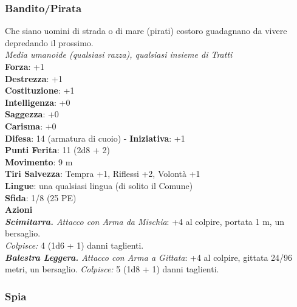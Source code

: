 \begin{multicols}{2}
\subsubsection{Bandito/Pirata}
Che siano uomini di strada o di mare (pirati) costoro guadagnano da vivere depredando il prossimo.\\
\emph{Media umanoide (qualsiasi razza), qualsiasi insieme di Tratti}\\
\textbf{Forza}: +1\\
\textbf{Destrezza}: +1\\
\textbf{Costituzione}: +1\\
\textbf{Intelligenza}: +0\\
\textbf{Saggezza}: +0\\
\textbf{Carisma}: +0\\
\textbf{Difesa}: 14 (armatura di cuoio) - \textbf{Iniziativa}: +1\\
\textbf{Punti Ferita}: 11 (2d8 + 2)\\
\textbf{Movimento}: 9 m\\
\textbf{Tiri Salvezza}: Tempra +1, Riflessi +2, Volontà +1 \\
\textbf{Lingue}: una qualsiasi lingua (di solito il Comune)\\
\textbf{Sfida}: 1/8 (25 PE)\smallskip\\
\smallskip\textbf{Azioni}\\
\emph{\textbf{Scimitarra.} Attacco con Arma da Mischia}: +4 al colpire, portata 1 m, un bersaglio.\\
\emph{Colpisce:} 4 (1d6 + 1) danni taglienti.\\
\emph{\textbf{Balestra Leggera.} Attacco con Arma a Gittata}: +4 al colpire, gittata 24/96 metri, un bersaglio. \emph{Colpisce:} 5 (1d8 + 1) danni taglienti.\\

\subsubsection{Spia}


\end{multicols}
